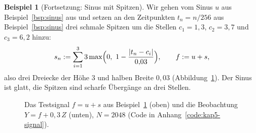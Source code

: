 \documentclass[a4paper,11pt,bibliography=totoc,listof=totoc,headinclude=true,cleardoublepage=empty,oneside]{scrbook}
\theoremstyle{plain}
\theoremstyle{definition}
\newtheorem{Beispiel}[Satz]{Beispiel}
\begin{document}
\begin{Beispiel}[Fortsetzung: Sinus mit Spitzen]
\label{bsp:spitzen}
Wir gehen vom Sinus $u$ aus Beispiel~\ref{bsp:sinus} aus und setzen an den
Zeitpunkten $t_n = n/256$ aus Beispiel~\ref{bsp:sinus} drei schmale Spitzen um
die Stellen $c_1 = 1{,}3$, $c_2 = 3{,}7$ und $c_3 = 6{,}2$ hinzu:
\[
  s_n := \sum_{i=1}^{3} 3\max\Bigl(0,\ 1-\frac{\lvert t_n-c_i\rvert}{0{,}03}\Bigr),
  \qquad f := u + s ,
\]
also drei Dreiecke der Höhe $3$ und halben Breite $0{,}03$
(Abbildung~\ref{fig:bsp-signal}). Der Sinus ist glatt, die Spitzen sind scharfe
Übergänge an drei Stellen.
 
\begin{figure}[htbp]
  \centering
  \caption[Testsignal des Kapitels]{Das Testsignal $f = u + s$ aus
  Beispiel~\ref{bsp:spitzen} (oben) und die Beobachtung $Y = f + 0{,}3\,Z$
  (unten), $N = 2048$ (Code in Anhang~\ref{code:kap5-signal}).}
  \label{fig:bsp-signal}
\end{figure}
 

\end{Beispiel}
\end{document}
